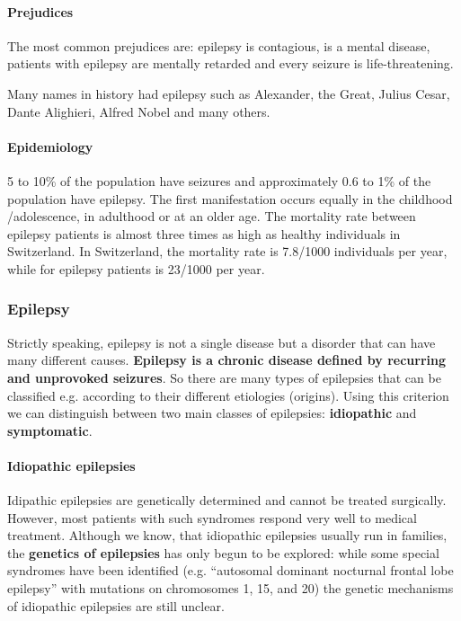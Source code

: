 \documentclass[12pt,article,oneside,a4paper]{memoir}
\begin{document}
\paragraph{Prejudices}
The most common prejudices are: epilepsy is contagious, is a mental disease,
patients with epilepsy are mentally retarded and every seizure is
life-threatening.

Many names in history had epilepsy such as Alexander, the Great, Julius Cesar,
Dante Alighieri, Alfred Nobel and many others.

\paragraph{Epidemiology}
5 to 10\% of the population have seizures and approximately 0.6 to 1\% of the
population have epilepsy. The first manifestation occurs equally in the childhood
/adolescence, in adulthood or at an older age.
The mortality rate between epilepsy patients is almost three times as high as
healthy individuals in Switzerland. In Switzerland, the mortality rate is 7.8/1000
individuals per year, while for epilepsy patients is 23/1000 per year.

\subsubsection{Epilepsy}
Strictly speaking, epilepsy is not a single disease but a disorder that can have
many different causes. \textbf{Epilepsy is a chronic disease defined by recurring
and unprovoked seizures}.
So there are many types of epilepsies that can be classified e.g. according to
their different etiologies (origins). Using this criterion we can distinguish
between two main classes of epilepsies: \textbf{idiopathic} and
\textbf{symptomatic}.

\paragraph{Idiopathic epilepsies}
Idipathic epilepsies are genetically determined and cannot be treated surgically.
However, most patients with such syndromes respond very well to medical treatment.
Although we know, that idiopathic epilepsies usually run in families, the
\textbf{genetics of epilepsies} has only begun to be explored: while some special
syndromes have been identified (e.g. ``autosomal dominant nocturnal frontal lobe
epilepsy'' with mutations on chromosomes 1, 15, and 20) the genetic mechanisms
of idiopathic epilepsies are still unclear.
\end{document}
